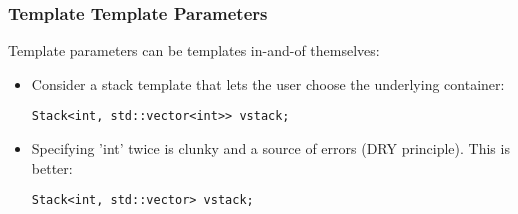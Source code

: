 \begin{frame}[fragile,t]
\frametitle{Template Template Parameters}
Template parameters can be templates in-and-of themselves:
\begin{itemize}[<+->]
\item Consider a stack template that lets the user choose the
  underlying container:
{\scriptsize
\begin{verbatim}
Stack<int, std::vector<int>> vstack;
\end{verbatim}
}
\vskip 12pt
\item Specifying 'int' twice is clunky and a source of errors (DRY
  principle).  This is better:
{\scriptsize
\begin{verbatim}
Stack<int, std::vector> vstack;
\end{verbatim}
}

\end{itemize}
\end{frame}

